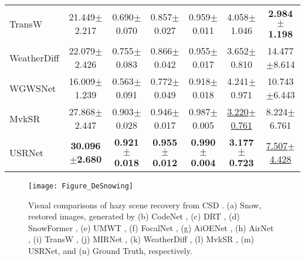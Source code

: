\documentclass[final,12pt]{elsarticle}
\begin{document}
\begin{table}[t]
\begin{tabular}{l|cccc|cc}
        TransW \citep{valanarasu2022transweather} & 21.449$\pm$2.217 & 0.690$\pm$0.070 & 0.857$\pm$0.027 & 0.959$\pm$0.011 & 4.058$\pm$1.046 & \textbf{2.984$\pm$1.198}  \\ 
        WeatherDiff \citep{ozdenizci2023restoring}  & 22.079$\pm$2.426 & 0.755$\pm$0.083 & 0.866$\pm$0.042 & 0.955$\pm$0.017 & 3.652$\pm$0.810 & 14.477$\pm$8.614 \\ 
        WGWSNet \citep{zhu2023learning}      & 16.009$\pm$1.239 & 0.563$\pm$0.091 & 0.772$\pm$0.049 & 0.918$\pm$0.018 & 4.241$\pm$0.971 & 10.743$\pm$6.443 \\ 
        MvkSR \citep{xu2024mvksr}        &   27.868$\pm$2.447 &	0.903$\pm$0.028	 & 0.946$\pm$0.017	 &0.987$\pm$0.005	 &\underline{3.220$\pm$0.761}	 &8.224$\pm$6.761\\ \hline
        USRNet       &\textbf{30.096$\pm$2.680} 	&\textbf{0.921$\pm$0.018} 	&\textbf{0.955$\pm$0.012} 	&\textbf{0.990$\pm$0.004} 	&\textbf{3.177$\pm$0.723}	&\underline{7.507$\pm$4.428}                  \\ \hline
        \end{tabular}\label{table:desnowing}
    \end{table}
    \begin{figure*}[t]
        \centering
        \setlength{\abovecaptionskip}{0.cm}
        \texttt{[image: Figure\_DeSnowing]}
        \caption{Visual comparisons of hazy scene recovery from CSD \citep{chen2021all}. (a) Snow, restored images, generated by (b) CodeNet \citep{yu2021single}, (c) DRT \citep{liang2022drt}, (d) SnowFormer \citep{chen2022snowformer}, (e) UMWT \citep{kulkarni2023unified}, (f) FocalNet \citep{cui2023focal}, (g) AiOENet \citep{liu2023aioenet}, (h) AirNet \citep{li2022all}, (i) TransW \citep{valanarasu2022transweather}, (j) MIRNet \citep{zamir2022learning}, (k) WeatherDiff \citep{ozdenizci2023restoring}, (l) MvkSR \citep{xu2024mvksr}, (m) USRNet, and (n) Ground Truth, respectively.}
        \label{Figure_Desnowing}
    \end{figure*}
\end{document}

